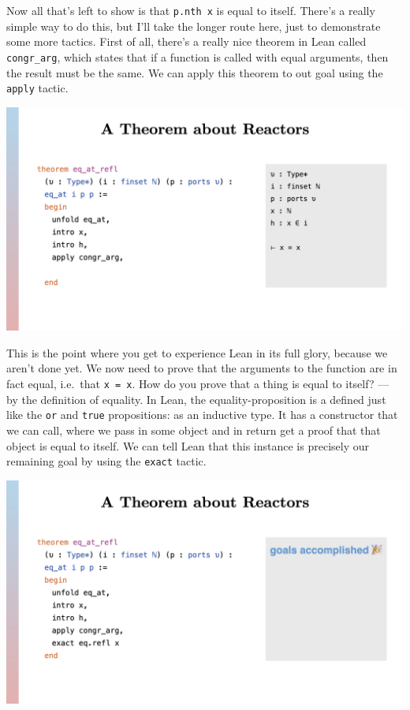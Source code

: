 \documentclass{article}
\begin{document}
Now all that's left to show is that \lstinline{p.nth x} is equal to
itself. There's a really simple way to do this, but I'll take the longer
route here, just to demonstrate some more tactics. First of all, there's
a really nice theorem in Lean called \lstinline{congr_arg}, which states
that if a function is called with equal arguments, then the result must
be the same. We can apply this theorem to out goal using the
\lstinline{apply} tactic.

\begin{center}
  \includegraphics[width=\columnwidth]{Slides/Slide 17.jpeg}
\end{center}

This is the point where you get to experience Lean in its full glory,
because we aren't done yet. We now need to prove that the arguments to
the function are in fact equal, i.e.~that \lstinline{x = x}. How do you
prove that a thing is equal to itself? --- by the definition of equality.
In Lean, the equality-proposition is a defined just like the \lstinline{or}
and \lstinline{true} propositions: as an inductive type. It has a
constructor that we can call, where we pass in some object and in return
get a proof that that object is equal to itself. We can tell Lean that
this instance is precisely our remaining goal by using the
\lstinline{exact} tactic.

\begin{center}
  \includegraphics[width=\columnwidth]{Slides/Slide 18.jpeg}
\end{center}
\end{document}
